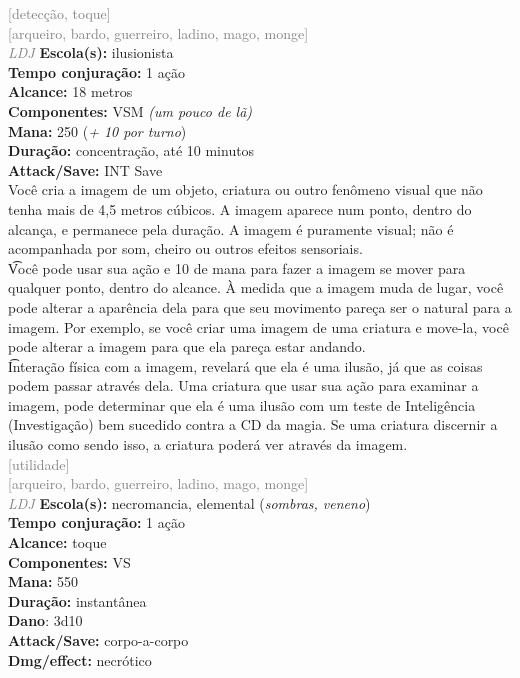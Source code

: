 \documentclass{RPG_Adventure}[2021/10/20]
\begin{document}
{\scriptsize \textcolor{gray}{[detecção, toque]\\}}
{\scriptsize \textcolor{gray}{[arqueiro, bardo, guerreiro, ladino, mago, monge]\\}}
{\tiny \textcolor{gray}{\textit{LDJ}}}
{\small \t \textbf{Escola(s):} ilusionista\\\t \textbf{Tempo conjuração:} 1 ação\\\t \textbf{Alcance:} 18 metros\\\t \textbf{Componentes:} VSM \textit{(um pouco de lã)}\\\t \textbf{Mana:} 250 (\textit{+ 10 por turno})\\\t \textbf{Duração:} concentração, até 10 minutos\\\t \textbf{Attack/Save:} INT Save\\}
{\normalsize Você cria a imagem de um objeto, criatura ou outro fenômeno visual que não tenha mais de 4,5 metros cúbicos. A imagem aparece num ponto, dentro do alcança, e permanece pela duração. A imagem é puramente visual; não é acompanhada por som, cheiro ou outros efeitos sensoriais.\\\t Você pode usar sua ação e 10 de mana para fazer a imagem se mover para qualquer ponto, dentro do alcance. À medida que a imagem muda de lugar, você pode alterar a aparência dela para que seu movimento pareça ser o natural para a imagem. Por exemplo, se você criar uma imagem de uma criatura e move-la, você pode alterar a imagem para que ela pareça estar andando.\\\t Interação física com a imagem, revelará que ela é uma ilusão, já que as coisas podem passar através dela. Uma criatura que usar sua ação para examinar a imagem, pode determinar que ela é uma ilusão com um teste de Inteligência (Investigação) bem sucedido contra a CD da magia. Se uma criatura discernir a ilusão como sendo isso, a criatura poderá ver através da imagem.\\}
{\scriptsize \textcolor{gray}{[utilidade]\\}}
{\scriptsize \textcolor{gray}{[arqueiro, bardo, guerreiro, ladino, mago, monge]\\}}
{\tiny \textcolor{gray}{\textit{LDJ}}}
{\small \t \textbf{Escola(s):} necromancia, elemental (\textit{sombras, veneno})\\\t \textbf{Tempo conjuração:} 1 ação\\\t \textbf{Alcance:} toque\\\t \textbf{Componentes:} VS\\\t \textbf{Mana:} 550\\\t \textbf{Duração:} instantânea\\\t \textbf{Dano}: 3d10\\\t \textbf{Attack/Save:} corpo-a-corpo\\\t \textbf{Dmg/effect:} necrótico\\}
\end{document}
